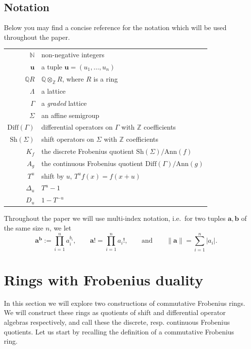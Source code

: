 \documentclass[oneside]{amsart}
\theoremstyle{plain}
\theoremstyle{definition}
\newcommand{\Z}{{\mathbb{Z}}}
\newcommand{\N}{{\mathbb{N}}}
\newcommand{\Q}{{\mathbb{Q}}}
\newcommand{\Ann}{{\mathrm{Ann}}}
\newcommand{\Diff}{{\mathrm{Diff}}}
\newcommand{\Sh}{{\mathrm{Sh}}}
\renewcommand{\vec}[1]{\ensuremath{\mathbf{#1}}}
\begin{document}
\subsection*{Notation}
Below you may find a concise reference for the notation which will be used throughout the paper.
\begin{center}
\begin{tabular}{r|l}
    $\N$ & non-negative integers \\
    $\vec u$ & a tuple $\vec u = (u_1, \dots, u_n)$ \\
    $\Q R$ & $\Q \otimes_\Z R$, where $R$ is a ring \\
    $\Lambda$ & a lattice \\
    $\Gamma$ & a \emph{graded} lattice \\
    $\Sigma$ & an affine semigroup \\
    $\Diff(\Gamma)$ & differential operators on $\Gamma$ with $\Z$ coefficients \\
    $\Sh(\Sigma)$ & shift operators on $\Sigma$ with $\Z$ coefficients \\
    $K_f$ & the discrete Frobenius quotient $\Sh(\Sigma)/\Ann(f)$ \\
    $A_g$ & the continuous Frobenius quotient $\Diff(\Gamma)/\Ann(g)$ \\
    $T^u$ & shift by $u$, $T^uf(x) = f(x + u)$\\
    $\Delta_u$ & $T^u - 1$\\
    $D_u$ & $1 - T^{-u}$
\end{tabular}
\end{center}
\medskip

Throughout the paper we will use multi-index notation, i.e.\ for two tuples $\vec a, \vec b$ of the same size $n$, we let
\[
    \vec a^{\vec b} := \prod_{i = 1}^n a_i^{b_i},
    \qquad
    \vec a! = \prod_{i = 1}^n a_i!,
    \qquad\textrm{and}\qquad
    \|\vec a\| = \sum_{i = 1}^n |a_i|.
\]


\section{Rings with Frobenius duality}
\label{sec:rings-with-duality}

In this section we will explore two constructions of commutative Frobenius rings. We will construct these rings as quotients of shift and differential operator algebras respectively, and call these the discrete, resp. continuous Frobenius quotients. Let us start by recalling the definition of a commutative Frobenius ring.
\end{document}
